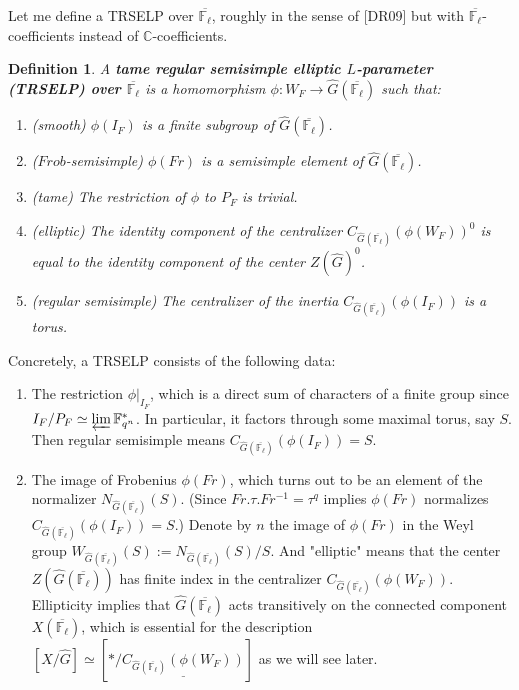 \documentclass{article}
\newtheorem{definition}{Definition}
\begin{document}
	Let me define a TRSELP over $\overline{\mathbb{F}_{\ell}}$, roughly in the sense of [DR09] but with $\overline{\mathbb{F}_\ell}$-coefficients instead of $\mathbb{C}$-coefficients.
	
	\begin{definition}
		A \textbf{tame regular semisimple elliptic $L$-parameter (TRSELP) over $\overline{\mathbb{F}_\ell}$} is a homomorphism $\phi: W_F \to \hat{G}(\overline{\mathbb{F}_\ell})$ such that:
		\begin{enumerate}
			\item (smooth) $\phi(I_F)$ is a finite subgroup of $\hat{G}(\overline{\mathbb{F}_\ell})$. 	 
			\item ($Frob$-semisimple) $\phi(Fr)$ is a semisimple element of $\hat{G}(\overline{\mathbb{F}_\ell})$.
			\item (tame) The restriction of $\phi$ to $P_F$ is trivial.
			\item (elliptic) The identity component of the centralizer $C_{\hat{G}(\overline{\mathbb{F}_\ell})}(\phi(W_F))^0$ is equal to the identity component of the center $Z(\hat{G})^0$.
			\item (regular semisimple) The centralizer of the inertia $C_{\hat{G}(\overline{\mathbb{F}_\ell})}(\phi(I_F))$ is a torus.
		\end{enumerate}
	\end{definition}
	
	Concretely, a TRSELP consists of the following data:
	\begin{enumerate}
		\item The restriction $\phi|_{I_F}$, which is a direct sum of characters of a finite group since $I_F/P_F \simeq \varprojlim\mathbb{F}_{q^n}^*$. In particular, it factors through some maximal torus, say $S$. Then regular semisimple means $C_{\hat{G}(\overline{\mathbb{F}_\ell})}(\phi(I_F))=S$.
		\item The image of Frobenius $\phi(Fr)$, which turns out to be an element of the normalizer  $N_{\hat{G}(\overline{\mathbb{F}_\ell})}(S)$. (Since $Fr.\tau.Fr^{-1}=\tau^q$ implies $\phi(Fr)$ normalizes $C_{\hat{G}(\overline{\mathbb{F}_\ell})}(\phi(I_F))=S$.) Denote by $n$ the image of $\phi(Fr)$ in the Weyl group $W_{\hat{G}(\overline{\mathbb{F}_\ell})}(S):=N_{\hat{G}(\overline{\mathbb{F}_\ell})}(S)/S$. And "elliptic" means that the center $Z(\hat{G}(\overline{\mathbb{F}_\ell}))$ has finite index in the centralizer $C_{\hat{G}(\overline{\mathbb{F}_\ell})}(\phi(W_F))$. Ellipticity implies that $\hat{G}(\overline{\mathbb{F}_\ell})$ acts transitively on the connected component $X(\overline{\mathbb{F}_\ell})$, which is essential for the description $[X/\hat{G}] \simeq [*/\underline{C_{\hat{G}(\overline{\mathbb{F}_\ell})}(\phi(W_F))}]$ as we will see later. 
	\end{enumerate}
	
\end{document}
